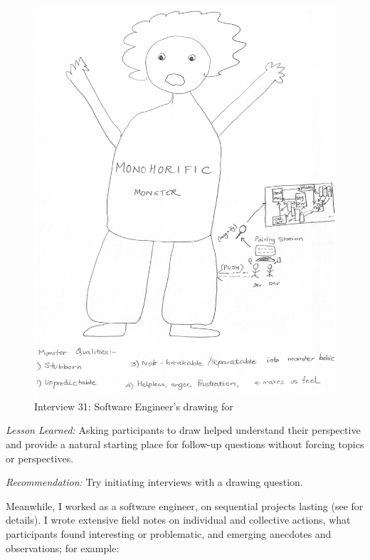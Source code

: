 \begin{figure}[htbp]
\centering
\includegraphics[width=\oneColumnWidth{}]{drawings/2016_09_26.png}
\caption{Interview 31: Software Engineer's drawing for }
\label{Interview31}
\end{figure}

\textit{Lesson Learned:} Asking participants to draw helped understand their perspective and provide a natural starting place for follow-up questions without forcing topics or perspectives.

\textit{Recommendation:} Try initiating interviews with a drawing question.

Meanwhile, I worked as a software engineer, on \numberOfObservedProjects{} sequential projects lasting \durationOfResearchStudyPlural{} (see \cite{SedanoSoftwareDevelopmentWaste} for details). I wrote extensive field notes on individual and collective actions, what participants found interesting or problematic, and emerging anecdotes and observations; for example: 

